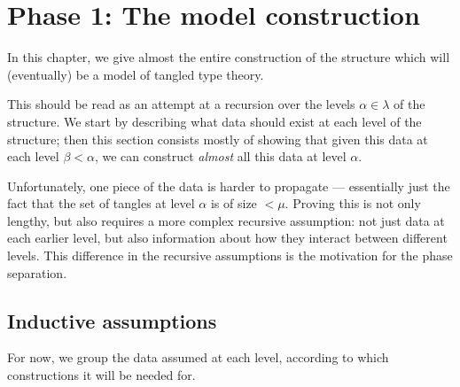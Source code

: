 \chapter{Phase 1: The model construction} \label{ch:model-construction}

In this chapter, we give almost the entire construction of the structure which will (eventually) be a model of tangled type theory.

This should be read as an attempt at a recursion over the levels $\alpha \in \lambda$ of the structure.  We start by describing what data should exist at each level of the structure; then this section consists mostly of showing that given this data at each level $\beta < \alpha$, we can construct \emph{almost} all this data at level $\alpha$.

Unfortunately, one piece of the data is harder to propagate --- essentially just the fact that the set of tangles at level $\alpha$ is of size $< \mu$.  Proving this is not only lengthy, but also requires a more complex recursive assumption: not just data at each earlier level, but also information about how they interact between different levels.  This difference in the recursive assumptions is the motivation for the phase separation.

\section{Inductive assumptions}

For now, we group the data assumed at each level, according to which constructions it will be needed for.


